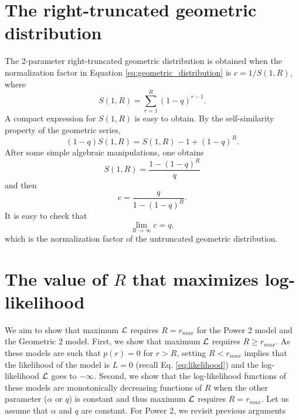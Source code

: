 \documentclass[USenglish]{article}
\newcommand{\loglikelihood}{{\cal L}}
\begin{document}
\section{The right-truncated geometric distribution}

\label{app:right_truncated_geometric}

The 2-parameter right-truncated geometric distribution is obtained when the normalization factor in Equation \ref{eq:geometric_distribution} is  
$c=1/S(1, R)$, where 
\begin{equation*}
S(1, R) = \sum_{r=1}^{R}(1 - q)^{r - 1}.
\end{equation*}
A compact expression for $S(1, R)$ is easy to obtain. By the self-similarity property of the geometric series,
\begin{equation*}
(1-q)S(1, R) = S(1, R) - 1 + (1-q)^{R}.
\end{equation*}
After some simple algebraic manipulations, one obtains 
\begin{equation*}
S(1, R) = \frac{1 - (1 - q)^{R}}{q}
\end{equation*}
and then 
\begin{equation*}
c = \frac{q}{1 - (1 - q)^{R}}.
\end{equation*}
It is easy to check that 
\begin{equation*}
\lim_{R \rightarrow \infty} c = q,
\end{equation*}
which is the normalization factor of the untruncated geometric distribution. 

\section{The value of $R$ that maximizes log-likelihood}

\label{app:optimal_truncation}

We aim to show that maximum $\loglikelihood$ requires $R = r_{max}$ for the Power 2 model and the Geometric 2 model.
First, we show that maximum $\loglikelihood$ requires $R \geq r_{max}$. As these models are such that $p(r) = 0$ for $r > R$, setting $R < r_{max}$ implies that the likelihood of the model is $L=0$ (recall Eq. \ref{eq:likelihood}) and the log-likelihood $\loglikelihood$ goes to $-\infty$.   
Second, we show that the log-likelihood functions of these models are monotonically decreasing functions of $R$ when the other parameter ($\alpha$ or $q$) is constant and thus maximum $\loglikelihood$ requires $R = r_{max}$. Let us assume that $\alpha$ and $q$ are constant. For Power 2, we revisit previous arguments 
\iftoggle{anonymous}{{\bf(author, year).}}
{\citep{Baixeries2012c}. }
\end{document}
